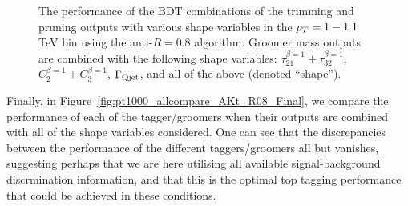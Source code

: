\begin{figure}
\centering
{}
\caption{The performance of the BDT combinations of the trimming and pruning outputs with various shape variables in the $p_T = 1-1.1$ TeV bin using the anti-\kT $R=0.8$ algorithm. Groomer mass outputs are combined with the following shape variables: $\tau_{21}^{\beta=1}+\tau_{32}^{\beta=1}$, $C_{2}^{\beta=1}+C_{3}^{\beta=1}$, $\Gamma_{\rm Qjet}$, and all of the above (denoted ``shape'').}
\label{fig:pt1000_allcompare_AKt_R08_GroomSh}
\end{figure}

Finally, in Figure~\ref{fig:pt1000_allcompare_AKt_R08_Final}, we compare the performance of each of the tagger/groomers when their outputs are combined with all of the shape variables considered. One can see that the discrepancies between the performance of the different taggers/groomers all but vanishes, suggesting perhaps that we are here utilising all available signal-background discrmination information, and that this is the optimal top tagging performance that could be achieved in these conditions. 

